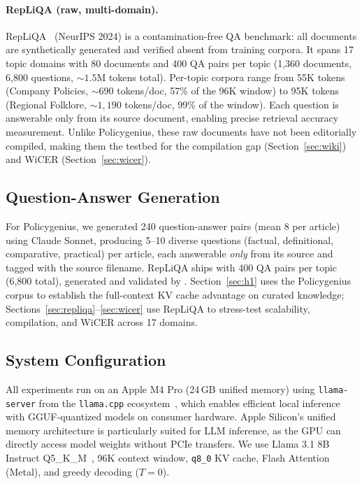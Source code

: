 \documentclass{article}
\begin{document}
\paragraph{RepLiQA (raw, multi-domain).}
\label{sec:repliqa_data}
RepLiQA~\cite{montero2024repliqa} (NeurIPS 2024) is a contamination-free
QA benchmark: all documents are synthetically generated and verified absent
from training corpora. It spans 17 topic domains with 80 documents and 400
QA pairs per topic (1{,}360 documents, 6{,}800 questions, ${\sim}1.5$M tokens
total). Per-topic corpora range from 55K tokens (Company Policies,
${\sim}690$ tokens/doc, 57\% of the 96K window) to 95K tokens (Regional
Folklore, ${\sim}1{,}190$ tokens/doc, 99\% of the window). Each question is
answerable only from its source document, enabling precise retrieval
accuracy measurement. Unlike Policygenius, these raw documents have not
been editorially compiled, making them the testbed for the compilation
gap (Section~\ref{sec:wiki}) and WiCER (Section~\ref{sec:wicer}).

\subsection{Question-Answer Generation}

For Policygenius, we generated 240 question-answer pairs (mean 8 per
article) using Claude Sonnet, producing 5--10 diverse questions
(factual, definitional, comparative, practical) per article, each
answerable \emph{only} from its source and tagged with the source
filename. RepLiQA ships with 400 QA pairs per topic (6{,}800 total),
generated and validated by \cite{montero2024repliqa}.
Section~\ref{sec:h1} uses the Policygenius corpus to establish the
full-context KV cache advantage on curated knowledge;
Sections~\ref{sec:repliqa}--\ref{sec:wicer} use RepLiQA to stress-test
scalability, compilation, and WiCER across 17 domains.

\subsection{System Configuration}

All experiments run on an Apple M4 Pro (24\,GB unified memory) using
\texttt{llama-server} from the \texttt{llama.cpp}
ecosystem~\cite{llamacpp2024}, which enables efficient local inference with
GGUF-quantized models on consumer hardware. Apple Silicon's unified memory
architecture is particularly suited for LLM inference, as the GPU can
directly access model weights without PCIe transfers. We use Llama 3.1 8B
Instruct Q5\_K\_M~\cite{dubey2024llama3}, 96K context window, \texttt{q8\_0}
KV cache, Flash Attention (Metal), and greedy decoding ($T{=}0$).
\end{document}
